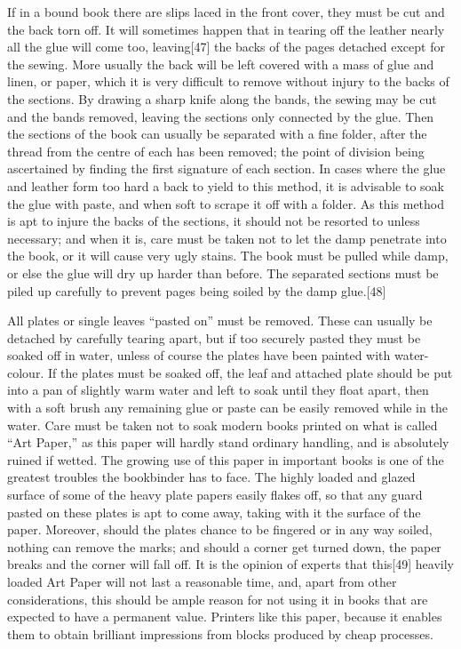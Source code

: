 \documentclass[
]{article}
\begin{document}
If in a bound book there are slips laced in the front cover, they must
be cut and the back torn off. It will sometimes happen that in tearing
off the leather nearly all the glue will come too,
leaving{\protect\hypertarget{Page_47}{}{{[}47{]}}} the backs of the
pages detached except for the sewing. More usually the back will be left
covered with a mass of glue and linen, or paper, which it is very
difficult to remove without injury to the backs of the sections. By
drawing a sharp knife along the bands, the sewing may be cut and the
bands removed, leaving the sections only connected by the glue. Then the
sections of the book can usually be separated with a fine folder, after
the thread from the centre of each has been removed; the point of
division being ascertained by finding the first signature of each
section. In cases where the glue and leather form too hard a back to
yield to this method, it is advisable to soak the glue with paste, and
when soft to scrape it off with a folder. As this method is apt to
injure the backs of the sections, it should not be resorted to unless
necessary; and when it is, care must be taken not to let the damp
penetrate into the book, or it will cause very ugly stains. The book
must be pulled while damp, or else the glue will dry up harder than
before. The separated sections must be piled up carefully to prevent
pages being soiled by the damp
glue.{\protect\hypertarget{Page_48}{}{{[}48{]}}}

All plates or single leaves ``pasted on'' must be removed. These can
usually be detached by carefully tearing apart, but if too securely
pasted they must be soaked off in water, unless of course the plates
have been painted with water-colour. If the plates must be soaked off,
the leaf and attached plate should be put into a pan of slightly warm
water and left to soak until they float apart, then with a soft brush
any remaining glue or paste can be easily removed while in the water.
Care must be taken not to soak modern books printed on what is called
``Art Paper,'' as this paper will hardly stand ordinary handling, and is
absolutely ruined if wetted. The growing use of this paper in important
books is one of the greatest troubles the bookbinder has to face. The
highly loaded and glazed surface of some of the heavy plate papers
easily flakes off, so that any guard pasted on these plates is apt to
come away, taking with it the surface of the paper. Moreover, should the
plates chance to be fingered or in any way soiled, nothing can remove
the marks; and should a corner get turned down, the paper breaks and the
corner will fall off. It is the opinion of experts that
this{\protect\hypertarget{Page_49}{}{{[}49{]}}} heavily loaded Art Paper
will not last a reasonable time, and, apart from other considerations,
this should be ample reason for not using it in books that are expected
to have a permanent value. Printers like this paper, because it enables
them to obtain brilliant impressions from blocks produced by cheap
processes.
\end{document}

